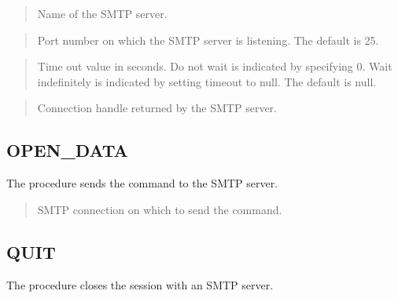 \documentclass[letterpaper,10pt,english,openany,oneside]{sphinxmanual}
\begin{document}

\begin{quote}

Name of the SMTP server.
\end{quote}

\begin{quote}

Port number on which the SMTP server is listening. The default is 25.
\end{quote}

\begin{quote}

Time out value in seconds. Do not wait is indicated by specifying 0.
Wait indefinitely is indicated by setting timeout to null. The default
is null.
\end{quote}

\begin{quote}

Connection handle returned by the SMTP server.
\end{quote}


\subsection{OPEN\_DATA}
\label{\detokenize{utl_smtp:open-data}}
The  procedure sends the  command to the SMTP server.
\begin{quote}

\end{quote}


\begin{quote}

SMTP connection on which to send the command.
\end{quote}


\subsection{QUIT}
\label{\detokenize{utl_smtp:quit}}
The  procedure closes the session with an SMTP server.
\begin{quote}

\end{quote}
\end{document}
